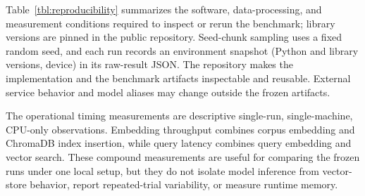 Table~\ref{tbl:reproducibility} summarizes the software, data-processing, and measurement conditions required to inspect or rerun the benchmark; library versions are pinned in the public repository. Seed-chunk sampling uses a fixed random seed, and each run records an environment snapshot (Python and library versions, device) in its raw-result JSON. The repository makes the implementation and the benchmark artifacts inspectable and reusable. External service behavior and model aliases may change outside the frozen artifacts.

The operational timing measurements are descriptive single-run, single-machine, CPU-only observations. Embedding throughput combines corpus embedding and ChromaDB index insertion, while query latency combines query embedding and vector search. These compound measurements are useful for comparing the frozen runs under one local setup, but they do not isolate model inference from vector-store behavior, report repeated-trial variability, or measure runtime memory.

